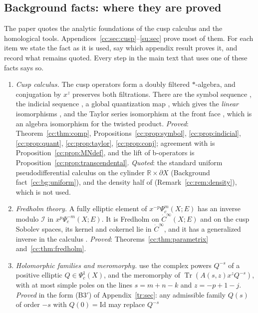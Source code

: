 \documentclass[11pt,oneside,reqno]{article}
\DeclareMathOperator{\Tr}{Tr}
\newcommand{\R}{\mathbb R}
\newcommand{\cI}{\mathcal I}
\newcommand{\Psic}{\Psi_{c}}
\newcommand{\dCI}{\dot C^\infty}
\theoremstyle{plain}
\theoremstyle{definition}
\theoremstyle{remark}
\begin{document}
\subsection{Background facts: where they are proved}\label{subsec:background}
The paper \cite{MN} quotes the analytic foundations of the cusp calculus
and the homological tools. Appendices~\ref{cc:sec:cusp}--\ref{su:sec}
prove most of them. For each item we state the fact as it is used, say
which appendix result proves it, and record what remains quoted. Every
step in the main text that uses one of these facts says so.
\begin{enumerate}
\item[(B1)] \emph{Cusp calculus.} The cusp operators form a doubly filtered
\(*\)-algebra, and conjugation by \(x^z\) preserves both filtrations. There
are the symbol sequence \cite[(11)]{MN}, the indicial sequence
\cite[(12)]{MN}, a global quantization map \cite[Prop.~24]{MN}, which
gives the \emph{linear} isomorphisms \cite[(13)]{MN}, and the Taylor series
isomorphism at the front face \cite[Prop.~25]{MN}, which is an algebra
isomorphism for the twisted product. \emph{Proved}:
Theorem~\ref{cc:thm:comp}, Propositions~\ref{cc:prop:symbol},
\ref{cc:prop:indicial}, \ref{cc:prop:quant}, \ref{cc:prop:taylor},
\ref{cc:prop:conj}; agreement with \cite[Def.~2]{MN} is
Proposition~\ref{cc:prop:MNdef}, and the lift of b-operators
\cite[Prop.~26]{MN} is Proposition~\ref{cc:prop:transcendental}.
\emph{Quoted}: the standard uniform pseudodifferential calculus on the
cylinder \(\R\times\partial X\) (Background fact~\ref{cc:bg:uniform}), and
the density half of \cite[Prop.~26]{MN} (Remark~\ref{cc:rem:density}),
which is not used.
\item[(B2)] \emph{Fredholm theory.} A fully elliptic element of
\(x^{-p}\Psic^m(X;E)\) has an inverse modulo \(\cI\) in
\(x^p\Psic^{-m}(X;E)\). It is Fredholm on \(\dCI(X;E)\) and on the cusp
Sobolev spaces, its kernel and cokernel lie in \(\dCI\), and it has a
generalized inverse in the calculus \cite[p.~4, \S12]{MN}. \emph{Proved}:
Theorems~\ref{cc:thm:parametrix} and~\ref{cc:thm:fredholm}.
\item[(B3)] \emph{Holomorphic families and meromorphy.} \cite[Lemma~4,
App.~B]{MN} use the complex powers \(Q^{-s}\) of a positive elliptic
\(Q\in\Psic^1(X)\), and the meromorphy of \(\Tr(A(s,z)x^zQ^{-s})\), with at
most simple poles on the lines \(s=m+n-k\) and \(z=-p+1-j\). \emph{Proved}
in the form (B3\('\)) of Appendix~\ref{tr:sec}: any admissible family
\(Q(s)\) of order \(-s\) with \(Q(0)=\mathrm{Id}\) may replace \(Q^{-s}\)

\end{enumerate}
\end{document}
